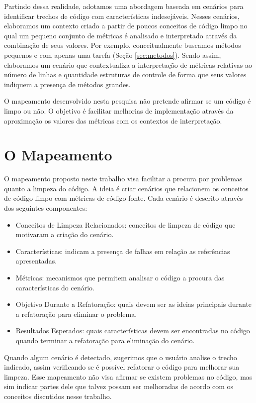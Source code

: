 Partindo dessa realidade, adotamos uma abordagem baseada em cenários para identificar trechos de código com características indesejáveis. Nesses cenários, elaboramos um contexto criado a partir de poucos conceitos de código limpo no qual um pequeno conjunto de métricas é analisado e interpretado através da combinação de seus valores. Por exemplo, conceitualmente buscamos métodos pequenos e com apenas uma tarefa (Seção \ref{sec:metodos}). Sendo assim, elaboramos um cenário que contextualiza a interpretação de métricas relativas ao número de linhas e quantidade estruturas de controle de forma que seus valores indiquem a presença de métodos grandes.
                         
O mapeamento desenvolvido nesta pesquisa não pretende afirmar se um código é limpo ou não. O objetivo é facilitar melhorias de implementação através da aproximação os valores das métricas com os contextos de interpretação. 
                         						
	
\section{O Mapeamento}
                    
O mapeamento proposto neste trabalho visa facilitar a procura por problemas quanto a limpeza do código. A ideia é criar cenários que relacionem os conceitos de código limpo com métricas de código-fonte. Cada cenário é descrito através dos seguintes componentes:
	
\begin{itemize}
	\item Conceitos de Limpeza Relacionados: conceitos de limpeza de código que motivaram a criação do cenário.
	\item Características: indicam a presença de falhas em relação as referências apresentadas.
	\item Métricas: mecanismos que permitem analisar o código a procura das características do cenário.
	\item Objetivo Durante a Refatoração: quais devem ser as ideias principais durante a refatoração para eliminar o problema.
	\item Resultados Esperados: quais características devem ser encontradas no código quando terminar a refatoração para eliminação do cenário.
\end{itemize}	


Quando algum cenário é detectado, sugerimos que o usuário analise o trecho indicado, assim verificando se é possível refatorar o código para melhorar sua limpeza. Esse mapeamento não visa afirmar se existem problemas no código, mas sim indicar partes dele que talvez possam ser melhoradas de acordo com os conceitos discutidos nesse trabalho.

